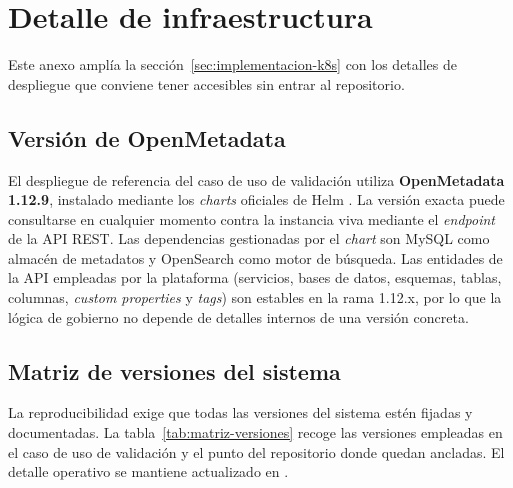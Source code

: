 \chapter{Detalle de infraestructura}\label{ap:infraestructura}

Este anexo amplía la sección~\ref{sec:implementacion-k8s} con los detalles de despliegue que conviene tener accesibles sin entrar al repositorio.

\section{Versión de OpenMetadata}\label{sec:version-openmetadata}

El despliegue de referencia del caso de uso de validación utiliza \textbf{OpenMetadata 1.12.9}, instalado mediante los \emph{charts} oficiales de Helm \cite{openmetadataKubernetes}. La versión exacta puede consultarse en cualquier momento contra la instancia viva mediante el \emph{endpoint}  de la \ac{API} \ac{REST}. Las dependencias gestionadas por el \emph{chart}  son MySQL como almacén de metadatos y OpenSearch como motor de búsqueda. Las entidades de la \ac{API} empleadas por la plataforma (servicios, bases de datos, esquemas, tablas, columnas, \emph{custom properties} y \emph{tags}) son estables en la rama 1.12.x, por lo que la lógica de gobierno no depende de detalles internos de una versión concreta.

\section{Matriz de versiones del sistema}\label{sec:matriz-versiones}

La reproducibilidad exige que todas las versiones del sistema estén fijadas y documentadas. La tabla~\ref{tab:matriz-versiones} recoge las versiones empleadas en el caso de uso de validación y el punto del repositorio donde quedan ancladas. El detalle operativo se mantiene actualizado en .

